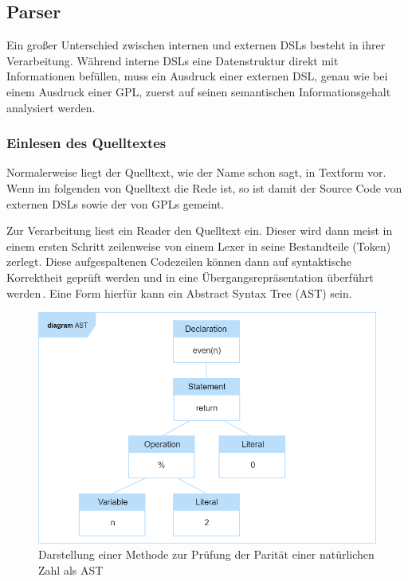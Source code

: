 \documentclass[12pt,oneside,a4paper,parskip]{scrbook}
\begin{document}
\subsection{Parser}

Ein großer Unterschied zwischen internen und externen DSLs besteht in ihrer Verarbeitung. Während interne DSLs eine Datenstruktur direkt mit Informationen befüllen, muss ein Ausdruck einer externen DSL, genau wie bei einem Ausdruck einer GPL, zuerst auf seinen semantischen Informationsgehalt analysiert werden.

\subsubsection{Einlesen des Quelltextes}

Normalerweise liegt der Quelltext, wie der Name schon sagt, in Textform vor. Wenn im folgenden von Quelltext die Rede ist, so ist damit der Source Code von externen DSLs sowie der von GPLs gemeint.

Zur Verarbeitung liest ein Reader den Quelltext ein. Dieser wird dann meist in einem ersten Schritt zeilenweise von einem Lexer in seine Bestandteile (Token) zerlegt. Diese aufgespaltenen Codezeilen können dann auf syntaktische Korrektheit geprüft werden und in eine Übergangsrepräsentation überführt werden\,\cite[S.\,29f.]{parr2009}. Eine Form hierfür kann ein Abstract Syntax Tree (AST) sein.

\begin{figure}[htbp]
\centering
\includegraphics[width=1.0\textwidth]{bilder/ast}
\caption{Darstellung einer Methode zur Prüfung der Parität einer natürlichen Zahl als AST}
\label{fig:ast}
\end{figure}
\end{document}
